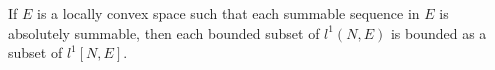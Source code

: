 If $E$ is a locally convex space such that each summable sequence in $E$ is absolutely summable, then each bounded subset of $l^1(N, E)$ is bounded as a subset of $l^1[N, E]$.
